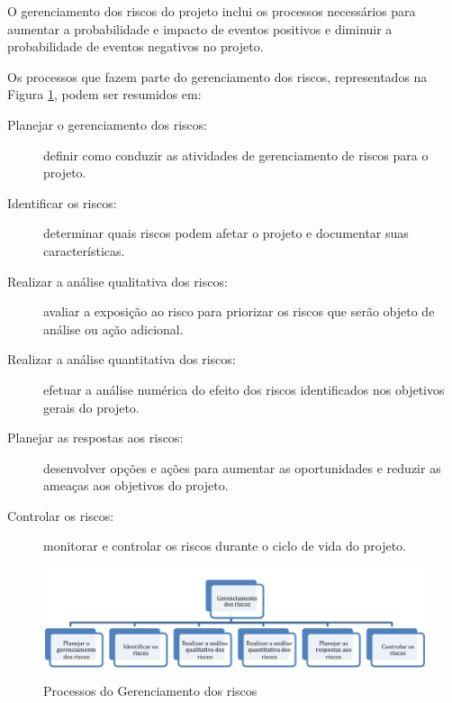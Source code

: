 


O gerenciamento dos riscos do projeto inclui os processos necessários para aumentar a probabilidade e impacto de eventos positivos e diminuir a probabilidade de eventos negativos no projeto.

Os processos que fazem parte do gerenciamento dos riscos, representados na Figura \ref{fig:proc:ger:riscos}, podem ser resumidos em:

\begin{description}
	
	\item[Planejar o gerenciamento dos riscos:] definir como conduzir as atividades de gerenciamento de riscos para o projeto.

	\item[Identificar os riscos:] determinar quais riscos podem afetar o projeto e documentar suas características.

	\item[Realizar a análise qualitativa dos riscos:]  avaliar a exposição ao risco para priorizar os riscos que serão objeto de análise ou ação adicional.

	\item[Realizar a análise quantitativa dos riscos:] efetuar a análise numérica do efeito dos riscos identificados nos objetivos gerais do projeto.

	\item[Planejar as respostas aos riscos:] desenvolver opções e ações para aumentar as oportunidades e reduzir as ameaças aos objetivos do projeto.

	\item[Controlar os riscos:] monitorar e controlar os riscos durante o ciclo de vida do projeto.	

\end{description}

\begin{figure}[!h]
	\centering
	\includegraphics[scale=0.75]{Figuras/gerenciamento_riscos.png}
	\caption{Processos do Gerenciamento dos riscos}
	\label{fig:proc:ger:riscos}
\end{figure}

